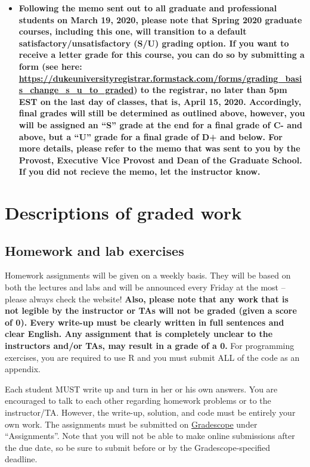 \documentclass[11pt, a4paper]{article}
\begin{document}
\begin{itemize}[label= {\color{darkblue}{\ArrowBoldRightStrobe}}]
	\item {\color{darkred} \textbf{Following the memo sent out to all graduate and professional students on March 19, 2020, please note that Spring 2020 graduate courses, including this one, will transition to a default satisfactory/unsatisfactory (S/U) grading option. If you want to receive a letter grade for this course, you can do so by submitting a form (see here: \url{https://dukeuniversityregistrar.formstack.com/forms/grading_basis_change_s_u_to_graded}) to the registrar, no later than 5pm EST on the last day of classes, that is, April 15, 2020. Accordingly, final grades will still be determined as outlined above, however, you will be assigned an ``S'' grade at the end for a final grade of C- and above, but a ``U'' grade for a final grade of D+ and below. For more details, please refer to the memo that was sent to you by the Provost, Executive Vice Provost and Dean of the Graduate School. If you did not recieve the memo, let the instructor know.}}
\end{itemize}


\section{Descriptions of graded work}
\subsection{Homework and lab exercises}
Homework assignments will be given on a weekly basis. They will be based on both the lectures and labs and will be announced every Friday at the most – please always check the website! \textbf{Also, please note that any work that is not legible by the instructor or TAs will not be graded (given a score  of 0). Every write-up must be clearly written in full sentences and clear English. Any assignment that is completely unclear to the instructors and/or TAs, may result in a grade of a 0.} For programming exercises, you are required to use R and you must submit ALL of the code as an appendix.  

Each student MUST write up and turn in her or his own answers. You are encouraged to talk to each other regarding homework problems or to the instructor/TA. However, the write-up, solution, and code must be entirely your own work. The assignments must be submitted on \href{https://www.gradescope.com/courses/77790/assignments}{Gradescope} under ``Assignments''. Note that you will not be able to make online submissions after the due date, so be sure to submit before or by the Gradescope-specified deadline.
\end{document}
